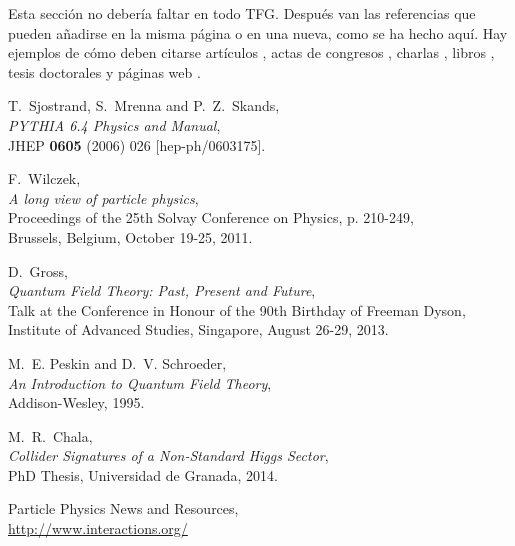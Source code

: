 \documentclass[11pt,a4paper,twoside,pdf]{article}
\numberwithin{equation}{section}
\begin{document}
Esta sección no debería faltar en todo TFG. Después van las referencias que pueden añadirse en la misma página o en una nueva, como se ha hecho aquí. Hay ejemplos de cómo deben citarse artículos \cite{PYTHIA}, actas de congresos \cite{conferencia}, charlas \cite{charla}, libros \cite{libro}, tesis doctorales \cite{tesis} y páginas web \cite{web}.

\newpage


\begin{thebibliography}{100}

  T.~Sjostrand, S.~Mrenna and P.~Z.~Skands, \\
  {\em PYTHIA 6.4 Physics and Manual}, \\
  JHEP {\bf 0605} (2006) 026  [hep-ph/0603175].
  
  F.~Wilczek, \\
  {\em A long view of particle physics}, \\
  Proceedings of the 25th Solvay Conference on Physics, p. 210-249, \\  
  Brussels, Belgium, October 19-25, 2011.

  D.~Gross, \\
  {\em Quantum Field Theory: Past, Present and Future}, \\
  Talk at the Conference in Honour of the 90th Birthday of Freeman Dyson, \\
  Institute of Advanced Studies, Singapore, August 26-29, 2013.

  M.~E. Peskin and D.~V. Schroeder, \\
  {\em An Introduction to Quantum Field Theory}, \\
  Addison-Wesley, 1995.
  
  M.~R.~Chala, \\
  {\em Collider Signatures of a Non-Standard Higgs Sector}, \\
  PhD Thesis, Universidad de Granada, 2014.

 Particle Physics News and Resources, \\
 \href{http://www.interactions.org/}{http://www.interactions.org/}
 
\end{thebibliography}
\end{document}
